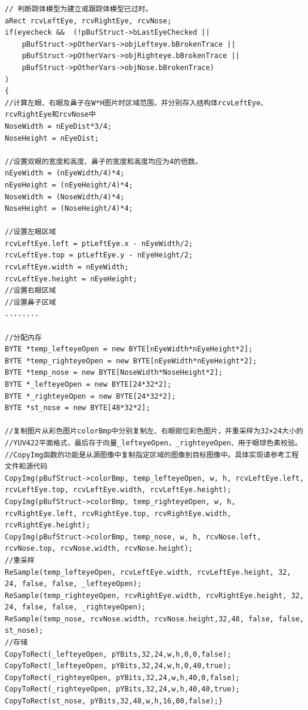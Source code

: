 \documentclass[12pt,hyperref,a4paper,UTF8]{ctexart}
\begin{document}
            
        \begin{lstlisting}[caption={复制并重采样眼睛鼻部位图片}, label={lst:example}]
// 判断踪体模型为建立或跟踪体模型已过时。
aRect rcvLeftEye, rcvRightEye, rcvNose;
if(eyecheck &&  (!pBufStruct->bLastEyeChecked ||    
    pBufStruct->pOtherVars->objLefteye.bBrokenTrace || 
    pBufStruct->pOtherVars->objRighteye.bBrokenTrace || 
    pBufStruct->pOtherVars->objNose.bBrokenTrace)
)
{
//计算左眼、右眼及鼻子在W*H图片时区域范围，并分别存入结构体rcvLeftEye、rcvRightEye和rcvNose中
NoseWidth = nEyeDist*3/4;
NoseHeight = nEyeDist;

//设置双眼的宽度和高度、鼻子的宽度和高度均应为4的倍数。
nEyeWidth = (nEyeWidth/4)*4;
nEyeHeight = (nEyeHeight/4)*4;
NoseWidth = (NoseWidth/4)*4;
NoseHeight = (NoseHeight/4)*4;

//设置左眼区域
rcvLeftEye.left = ptLeftEye.x - nEyeWidth/2;
rcvLeftEye.top = ptLeftEye.y - nEyeHeight/2;
rcvLeftEye.width = nEyeWidth;
rcvLeftEye.height = nEyeHeight;
//设置右眼区域
//设置鼻子区域
........

//分配内存
BYTE *temp_lefteyeOpen = new BYTE[nEyeWidth*nEyeHeight*2];
BYTE *temp_righteyeOpen = new BYTE[nEyeWidth*nEyeHeight*2];
BYTE *temp_nose = new BYTE[NoseWidth*NoseHeight*2];
BYTE *_lefteyeOpen = new BYTE[24*32*2];
BYTE *_righteyeOpen = new BYTE[24*32*2];
BYTE *st_nose = new BYTE[48*32*2];

//复制图片从彩色图片colorBmp中分别复制左、右眼部位彩色图片，并重采样为32×24大小的
//YUV422平面格式，最后存于向量_lefteyeOpen，_righteyeOpen、用于眼球色素校验。
//CopyImg函数的功能是从源图像中复制指定区域的图像到目标图像中。具体实现请参考工程文件和源代码
CopyImg(pBufStruct->colorBmp, temp_lefteyeOpen, w, h, rcvLeftEye.left, rcvLeftEye.top, rcvLeftEye.width, rcvLeftEye.height);
CopyImg(pBufStruct->colorBmp, temp_righteyeOpen, w, h, rcvRightEye.left, rcvRightEye.top, rcvRightEye.width, rcvRightEye.height);
CopyImg(pBufStruct->colorBmp, temp_nose, w, h, rcvNose.left, rcvNose.top, rcvNose.width, rcvNose.height);
//重采样
ReSample(temp_lefteyeOpen, rcvLeftEye.width, rcvLeftEye.height, 32, 24, false, false, _lefteyeOpen);
ReSample(temp_righteyeOpen, rcvRightEye.width, rcvRightEye.height, 32, 24, false, false, _righteyeOpen);
ReSample(temp_nose, rcvNose.width, rcvNose.height,32,48, false, false, st_nose);
//存储
CopyToRect(_lefteyeOpen, pYBits,32,24,w,h,0,0,false);
CopyToRect(_lefteyeOpen, pYBits,32,24,w,h,0,40,true);
CopyToRect(_righteyeOpen, pYBits,32,24,w,h,40,0,false);
CopyToRect(_righteyeOpen, pYBits,32,24,w,h,40,40,true);
CopyToRect(st_nose, pYBits,32,48,w,h,16,80,false);}
        \end{lstlisting}
\end{document}
